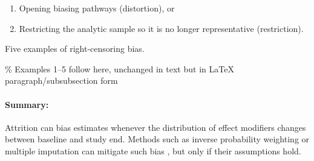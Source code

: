 \documentclass[
  ignorenonframetext,
  aspectratio=169,
]{beamer}
\begin{document}
\begin{frame}
\begin{enumerate}
    \item Opening biasing pathways (distortion), or
    \item Restricting the analytic sample so it is no longer representative (restriction).
\end{enumerate}

\begin{table}[ht]
\centering
\terminologycensoring
\caption{Five examples of right-censoring bias.}
\label{tbl-terminologycensoring}
\end{table}

\% Examples 1--5 follow here, unchanged in text but in LaTeX
paragraph/subsubsection form

\paragraph{Summary:}

Attrition can bias estimates whenever the distribution of effect
modifiers changes between baseline and study end. Methods such as
inverse probability weighting or multiple imputation can mitigate such
bias \citep{bulbulia2024PRACTICAL}, but only if their assumptions hold.
\end{frame}
\end{document}
